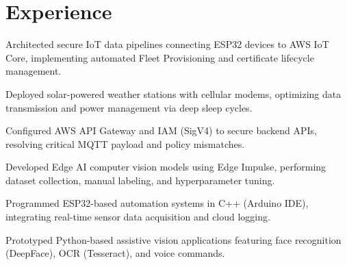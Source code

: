 \documentclass[]{plushcv}
\begin{document}
%
%


%
%

\begin{minipage}[t]{0.68\textwidth} 



\section{Experience}

\begin{tightemize}
\item Architected secure IoT data pipelines connecting ESP32 devices to AWS IoT Core, implementing automated Fleet Provisioning and certificate lifecycle management.
\item Deployed solar-powered weather stations with cellular modems, optimizing data transmission and power management via deep sleep cycles.
\item Configured AWS API Gateway and IAM (SigV4) to secure backend APIs, resolving critical MQTT payload and policy mismatches.
\end{tightemize}
\sectionsep


\begin{tightemize}
\item Developed Edge AI computer vision models using Edge Impulse, performing dataset collection, manual labeling, and hyperparameter tuning.
\item Programmed ESP32-based automation systems in C++ (Arduino IDE), integrating real-time sensor data acquisition and cloud logging.
\item Prototyped Python-based assistive vision applications featuring face recognition (DeepFace), OCR (Tesseract), and voice commands.
\end{tightemize}
\sectionsep



\end{minipage}
\end{document}
